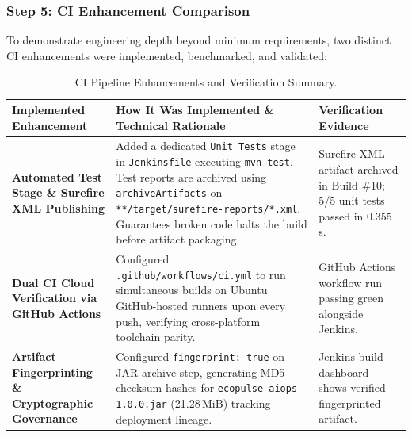 \documentclass[12pt,a4paper]{article}
\begin{document}
\vspace{0.3cm}
\subsubsection*{Step 5: CI Enhancement Comparison}
To demonstrate engineering depth beyond minimum requirements, two distinct CI enhancements were implemented, benchmarked, and validated:

\begin{table}[H]
\centering
\small
\renewcommand{\arraystretch}{1.3}
\begin{tabular}{|p{3.5cm}|p{6.5cm}|p{4.5cm}|}
\hline
\textbf{Implemented Enhancement} & \textbf{How It Was Implemented \& Technical Rationale} & \textbf{Verification Evidence} \\
\hline
\textbf{Automated Test Stage \& Surefire XML Publishing} & Added a dedicated \texttt{Unit Tests} stage in \texttt{Jenkinsfile} executing \texttt{mvn test}. Test reports are archived using \texttt{archiveArtifacts} on \texttt{**/target/surefire-reports/*.xml}. Guarantees broken code halts the build before artifact packaging. & Surefire XML artifact archived in Build \#10; 5/5 unit tests passed in 0.355\,s. \\
\hline
\textbf{Dual CI Cloud Verification via GitHub Actions} & Configured \texttt{.github/workflows/ci.yml} to run simultaneous builds on Ubuntu GitHub-hosted runners upon every push, verifying cross-platform toolchain parity. & GitHub Actions workflow run passing green alongside Jenkins. \\
\hline
\textbf{Artifact Fingerprinting \& Cryptographic Governance} & Configured \texttt{fingerprint: true} on JAR archive step, generating MD5 checksum hashes for \texttt{ecopulse-aiops-1.0.0.jar} (21.28\,MiB) tracking deployment lineage. & Jenkins build dashboard shows verified fingerprinted artifact. \\
\hline
\end{tabular}
\caption{CI Pipeline Enhancements and Verification Summary.}
\end{table}
\end{document}
